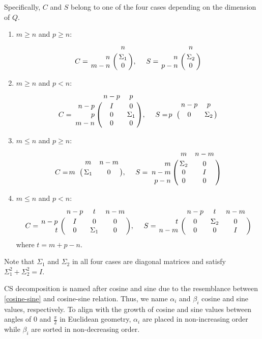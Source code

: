     Specifically, $C$ and $S$ belong to one of the four cases depending on the dimension of $Q$.
    \begin{enumerate}
        \item $m \geq n$ and $p \geq n$:
        \begin{displaymath}
            C = \bordermatrix{ & n  \cr
            \hfill n & \Sigma_1 \cr
            \hfill m-n & 0}, \  \ \ \
            S = \bordermatrix{ & n \cr
            \hfill n & \Sigma_2 \cr
            \hfill p-n & 0}
        \end{displaymath}
        
        \item $m \geq n$ and $p < n$:
        \begin{displaymath}
            C = \bordermatrix{ & n-p & p  \cr
            \hfill n-p & I & 0 \cr
            \hfill p & 0 & \Sigma_1 \cr
            \hfill m-n & 0 & 0}, \  \ \ \
            S = \bordermatrix{ & n-p & p\cr
            \hfill p & 0 & \Sigma_2}
        \end{displaymath}
        
        \item $m \leq n$ and $p \geq n$:
        \begin{displaymath}
            C = \bordermatrix{ & m & n-m\cr
            \hfill m & \Sigma_1 & 0}, \  \ \ \
            S = \bordermatrix{ & m & n-m  \cr
            \hfill m & \Sigma_2 & 0 \cr
            \hfill n-m & 0 & I \cr
            \hfill p-n & 0 & 0}
        \end{displaymath}
        
        \item $m \leq n$ and $p < n$:
        \begin{displaymath}
            C = \bordermatrix{ & n-p & t & n-m \cr
            \hfill n-p & I & 0 & 0 \cr
            \hfill t & 0 & \Sigma_1 & 0}, \  \ \ \
            S = \bordermatrix{ & n-p & t & n-m \cr
            \hfill t & 0 & \Sigma_2 & 0 \cr
            \hfill n-m & 0 & 0 & I}
        \end{displaymath}
        where $t = m+p-n$.
    \end{enumerate}
    
    Note that $\Sigma_1$ and $\Sigma_2$ in all four cases are diagonal matrices and satisfy $\Sigma_1^2 + \Sigma_2^2 = I$.

    CS decomposition is named after cosine and sine due to the resemblance between \eqref{cosine-sine} and cosine-sine relation. Thus, we name $\alpha_i$ and $\beta_i$ cosine and sine values, respectively. To align with the growth of cosine and sine values between angles of 0 and $\frac{\pi}{2}$ in Euclidean geometry, $\alpha_i$ are placed in non-increasing order while $\beta_i$ are sorted in non-decreasing order. 


